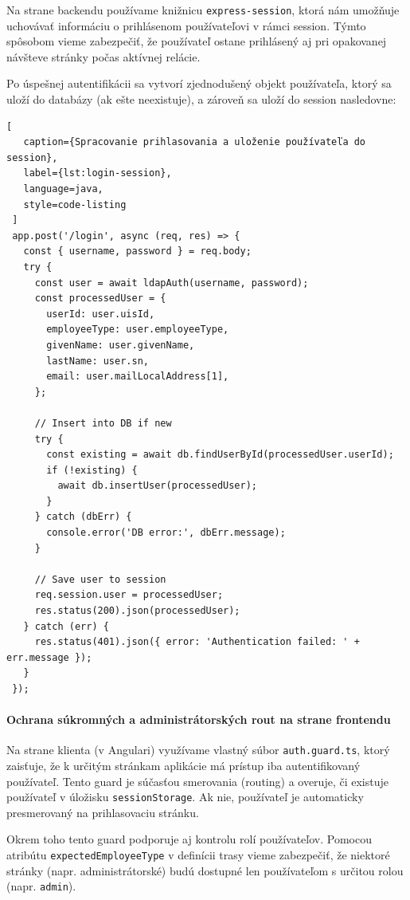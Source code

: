  Na strane backendu používame knižnicu \texttt{express-session}, ktorá nám umožňuje uchovávať informáciu o prihlásenom používateľovi v rámci session. Týmto spôsobom vieme zabezpečiť, že používateľ ostane prihlásený aj pri opakovanej návšteve stránky počas aktívnej relácie.
 
 Po úspešnej autentifikácii sa vytvorí zjednodušený objekt používateľa, ktorý sa uloží do databázy (ak ešte neexistuje), a zároveň sa uloží do session nasledovne:
 
 \begin{lstlisting}[
   caption={Spracovanie prihlasovania a uloženie používateľa do session},
   label={lst:login-session},
   language=java,
   style=code-listing
 ]
 app.post('/login', async (req, res) => {
   const { username, password } = req.body;
   try {
     const user = await ldapAuth(username, password);
     const processedUser = {
       userId: user.uisId,
       employeeType: user.employeeType,
       givenName: user.givenName,
       lastName: user.sn,
       email: user.mailLocalAddress[1],
     };
 
     // Insert into DB if new
     try {
       const existing = await db.findUserById(processedUser.userId);
       if (!existing) {
         await db.insertUser(processedUser);
       }
     } catch (dbErr) {
       console.error('DB error:', dbErr.message);
     }
 
     // Save user to session
     req.session.user = processedUser;
     res.status(200).json(processedUser);
   } catch (err) {
     res.status(401).json({ error: 'Authentication failed: ' + err.message });
   }
 });
 \end{lstlisting}
 
 \paragraph{Ochrana súkromných a administrátorských rout na strane frontendu}

Na strane klienta (v Angulari) využívame vlastný súbor \texttt{auth.guard.ts}, ktorý zaisťuje, že k určitým stránkam aplikácie má prístup iba autentifikovaný používateľ. Tento guard je súčasťou smerovania (routing) a overuje, či existuje používateľ v úložisku \texttt{sessionStorage}. Ak nie, používateľ je automaticky presmerovaný na prihlasovaciu stránku.

Okrem toho tento guard podporuje aj kontrolu rolí používateľov. Pomocou atribútu \texttt{expectedEmployeeType} v definícii trasy vieme zabezpečiť, že niektoré stránky (napr. administrátorské) budú dostupné len používateľom s určitou rolou (napr. \texttt{admin}).

